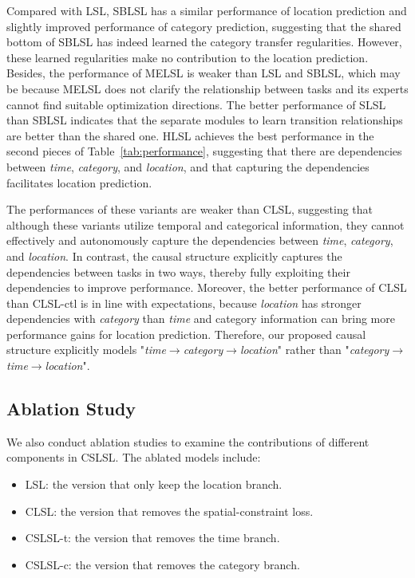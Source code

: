 \documentclass[sigconf]{acmart}
\begin{document}
    Compared with LSL, SBLSL has a similar performance of location prediction and slightly improved performance of category prediction, suggesting that the shared bottom of SBLSL has indeed learned the category transfer regularities. However, these learned regularities make no contribution to the location prediction. 
    Besides, the performance of MELSL is weaker than LSL and SBLSL, which may be because MELSL does not clarify the relationship between tasks and its experts cannot find suitable optimization directions. 
    The better performance of SLSL than SBLSL indicates that the separate modules to learn transition relationships are better than the shared one. 
    HLSL achieves the best performance in the second pieces of Table~\ref{tab:performance}, suggesting that there are dependencies between \textit{time}, \textit{category}, and \textit{location}, and that capturing the dependencies facilitates location prediction.
    

    The performances of these variants are weaker than CLSL, suggesting that although these variants utilize temporal and categorical information, they cannot effectively and autonomously capture the dependencies between \textit{time}, \textit{category}, and \textit{location}. In contrast, the causal structure explicitly captures the dependencies between tasks in two ways, thereby fully exploiting their dependencies to improve performance. Moreover, the better performance of CLSL than CLSL-ctl is in line with expectations, because \textit{location} has stronger dependencies with \textit{category} than \textit{time} and category information can bring more performance gains for location prediction. 
    Therefore, our proposed causal structure explicitly models "\textit{time$\to$category$\to$location}" rather than "\textit{category$\to$time$\to$location}".




\subsection{Ablation Study}

    We also conduct ablation studies to examine the contributions of different components in CSLSL. The ablated models include:
    \begin{itemize}[leftmargin=*, topsep=2pt]
        \item LSL: the version that only keep the location branch.
        \item CLSL: the version that removes the spatial-constraint loss.
        \item CSLSL-t: the version that removes the time branch.
        \item CSLSL-c: the version that removes the category branch. 
    \end{itemize}
    
\end{document}
